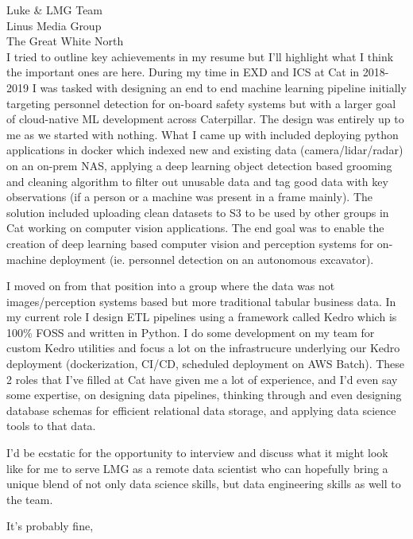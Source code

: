 \documentclass[11pt]{letter} %
\begin{document}
\begin{letter}{Luke \& LMG Team \\
Linus Media Group \\
The Great White North \\
}
I tried to outline key achievements in my resume but I'll highlight what I think the important ones are here. 
During my time in EXD and ICS at Cat in 2018-2019 I was tasked with designing an end to end machine learning pipeline initially targeting personnel detection for on-board safety systems but with a larger goal of cloud-native ML development across Caterpillar.
The design was entirely up to me as we started with nothing.
What I came up with included deploying python applications in docker which indexed new and existing data (camera/lidar/radar) on an on-prem NAS, applying a deep learning object detection based grooming and cleaning algorithm to filter out unusable data and tag good data with key observations (if a person or a machine was present in a frame mainly). 
The solution included uploading clean datasets to S3 to be used by other groups in Cat working on computer vision applications. The end goal was to enable the creation of deep learning based computer vision and perception systems for on-machine deployment (ie. personnel detection on an autonomous excavator).

I moved on from that position into a group where the data was not images/perception systems based but more traditional tabular business data.
In my current role I design ETL pipelines using a framework called Kedro which is 100\% FOSS and written in Python.
I do some development on my team for custom Kedro utilities and focus a lot on the infrastrucure underlying our Kedro deployment (dockerization, CI/CD, scheduled deployment on AWS Batch).
These 2 roles that I've filled at Cat have given me a lot of experience, and I'd even say some expertise, on designing data pipelines, thinking through and even designing database schemas for efficient relational data storage, and applying data science tools to that data.

I'd be ecstatic for the opportunity to interview and discuss what it might look like for me to serve LMG as a remote data scientist who can hopefully bring a unique blend of not only data science skills, but data engineering skills as well to the team.

\closing{It's probably fine,}




\end{letter}
\end{document}
